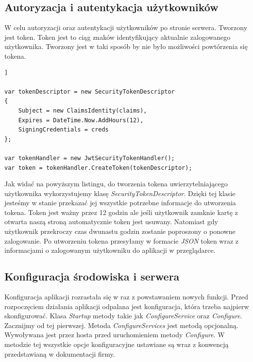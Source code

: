 \documentclass[12pt,a4paper]{article}
\begin{document}
\subsection{Autoryzacja i autentykacja użytkowników}

\hspace*{0.7cm} W celu autoryzacji oraz autentykacji użytkowników po stronie serwera. Tworzony jest token. Token jest to ciąg znaków identyfikujący aktualnie zalogowanego użytkownika. Tworzony jest w taki sposób by nie było możliwości powtórzenia się tokena.

\begin{lstlisting}[caption={Tworzenie tokena przy logowaniu}]]

var tokenDescriptor = new SecurityTokenDescriptor
{
	Subject = new ClaimsIdentity(claims),
	Expires = DateTime.Now.AddHours(12),
	SigningCredentials = creds
};

var tokenHandler = new JwtSecurityTokenHandler();
var token = tokenHandler.CreateToken(tokenDescriptor);

\end{lstlisting}

\hspace*{0.7cm} Jak widać na powyższym listingu, do tworzenia tokena uwierzytelniającego użytkownika wykorzystujemy klasę \textit{SecurityTokenDescriptor}. Dzięki tej klasie jesteśmy w stanie przekazać jej wszystkie potrzebne informacje do utworzenia tokena. Token jest ważny przez 12 godzin ale jeśli użytkownik zamknie kartę z otwarta naszą stroną automatycznie token jest usuwany. Natomiast gdy użytkownik przekroczy czas dwunastu godzin zostanie poproszony o ponowne zalogowanie. Po utworzeniu tokena przesyłamy w formacie \textit{JSON} token wraz z informacjami o zalogowanym użytkowniku do aplikacji w przeglądarce.

\subsection{Konfiguracja środowiska i serwera}

\hspace*{0.7cm} Konfiguracja aplikacji rozrastała się w raz z powstawaniem nowych funkcji. Przed rozpoczęciem działania aplikacji odpalana jest konfiguracja, która trzeba najpierw skonfigurować. Klasa \textit{Startup} metody takie jak \textit{ConfigureService} oraz \textit{Configure}. Zacznijmy od tej pierwszej. Metoda \textit{ConfigureServices} jest metodą opcjonalną. Wywoływana jest przez hosta przed uruchomieniem metody \textit{Configure}. W metodzie tej wszystkie opcje konfiguracyjne ustawiane są wraz z konwencją przedstawianą w dokumentacji firmy.
\end{document}
